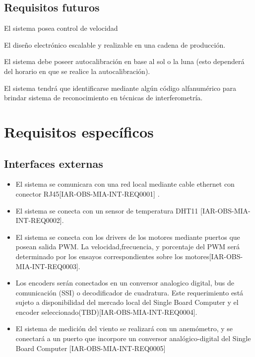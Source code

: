\documentclass[12pt,a4paper, twosite]{article}
\begin{document}
	
	
	\subsection{Requisitos futuros}
	\label{sec:org33cfcdb}
	El sistema posea control de velocidad 
	
	El diseño electrónico escalable y realizable en una cadena de producción.  
	
	El sistema debe poseer autocalibración en base al sol o la luna (esto dependerá del horario en que se realice la autocalibración).  
	
	El sistema tendrá que identificarse mediante algún código alfanumérico para brindar sistema de reconocimiento en técnicas de interferometría. 
	
	
	\section{Requisitos específicos}
	\label{sec:org40573d1}
	
	
	\subsection{Interfaces externas}
	\label{sec:orgfd5391f}
	\begin{itemize}
		\item El sistema se comunicara con una red local mediante cable ethernet con conector RJ45[IAR-OBS-MIA-INT-REQ0001] .
		\item El sistema se conecta con un sensor de temperatura DHT11 [IAR-OBS-MIA-INT-REQ0002]. 
		\item El sistema se conecta con los drivers de los motores mediante puertos que posean salida PWM. La velocidad,frecuencia, y porcentaje del PWM será determinado por los ensayos correspondientes sobre los motores[IAR-OBS-MIA-INT-REQ0003].  
		\item Los encoders serán conectados en un conversor analogico digital, bus de comunicación (SSI) o decodificador de cuadratura. Este requerimiento está sujeto a disponibilidad del mercado local del Single Board Computer y el encoder seleccionado(TBD)[IAR-OBS-MIA-INT-REQ0004]. 
		\item El sistema de medición del viento se realizará con un anemómetro, y se conectará a un puerto que incorpore un conversor analógico-digital del Single Board Computer [IAR-OBS-MIA-INT-REQ0005]
%			
		
	\end{itemize}
	
\end{document}
